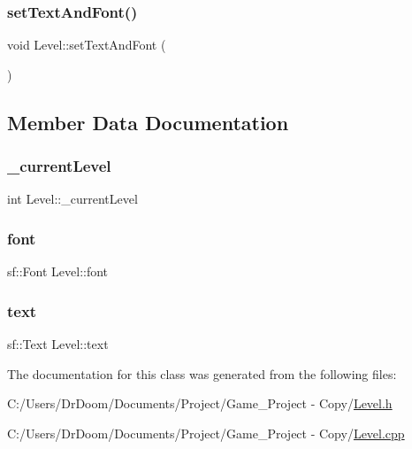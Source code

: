 \mbox{\label{class_level_aa726d09473bbb551477994c70e516a99}} 
\subsubsection{\texorpdfstring{set\+Text\+And\+Font()}{setTextAndFont()}}
{\footnotesize\ttfamily void Level\+::set\+Text\+And\+Font (\begin{DoxyParamCaption}{ }\end{DoxyParamCaption})\hspace{0.3cm}{\ttfamily [private]}}



\subsection{Member Data Documentation}
\mbox{\label{class_level_a70f3892ab0296e9ab92798b62d1dc894}} 
\subsubsection{\texorpdfstring{\+\_\+current\+Level}{\_currentLevel}}
{\footnotesize\ttfamily int Level\+::\+\_\+current\+Level\hspace{0.3cm}{\ttfamily [private]}}

\mbox{\label{class_level_af8ac9bfc42fb1b12b12538e2b9c170e7}} 
\subsubsection{\texorpdfstring{font}{font}}
{\footnotesize\ttfamily sf\+::\+Font Level\+::font\hspace{0.3cm}{\ttfamily [private]}}

\mbox{\label{class_level_a4f0d652d48634a83436f314c0581ac23}} 
\subsubsection{\texorpdfstring{text}{text}}
{\footnotesize\ttfamily sf\+::\+Text Level\+::text\hspace{0.3cm}{\ttfamily [private]}}



The documentation for this class was generated from the following files\+:\begin{DoxyCompactItemize}
\item 
C\+:/\+Users/\+Dr\+Doom/\+Documents/\+Project/\+Game\+\_\+\+Project -\/ Copy/\hyperlink{_level_8h}{Level.\+h}\item 
C\+:/\+Users/\+Dr\+Doom/\+Documents/\+Project/\+Game\+\_\+\+Project -\/ Copy/\hyperlink{_level_8cpp}{Level.\+cpp}\end{DoxyCompactItemize}
